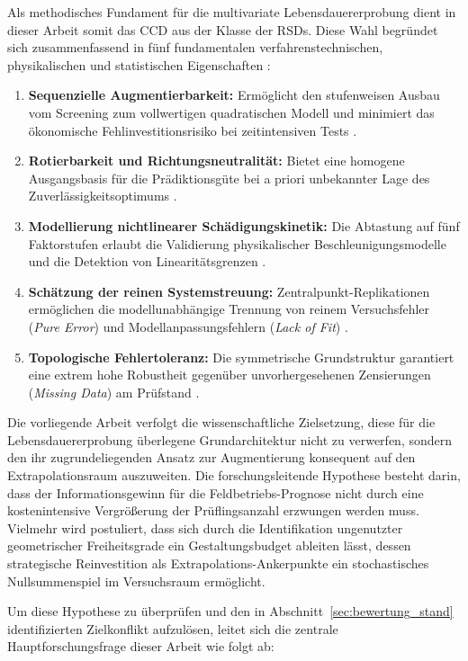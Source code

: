Als methodisches Fundament für die multivariate Lebensdauererprobung dient in dieser Arbeit somit das \ac{CCD} aus der Klasse der \acp{RSD}.
Diese Wahl begründet sich zusammenfassend in fünf fundamentalen verfahrenstechnischen, physikalischen und statistischen Eigenschaften \cite{Box.1957, Meeker.2022, Myers.2016}:
\begin{enumerate}
    \item \textbf{Sequenzielle Augmentierbarkeit:} Ermöglicht den stufenweisen Ausbau vom Screening zum vollwertigen quadratischen Modell und minimiert das ökonomische Fehlinvestitionsrisiko bei zeitintensiven Tests \cite{Bertsche.2022}.
    \item \textbf{Rotierbarkeit und Richtungsneutralität:} Bietet eine homogene Ausgangsbasis für die Prädiktionsgüte bei a priori unbekannter Lage des Zuverlässigkeitsoptimums \cite{Meeker.2022}.
    \item \textbf{Modellierung nichtlinearer Schädigungskinetik:} Die Abtastung auf fünf Faktorstufen erlaubt die Validierung physikalischer Beschleunigungsmodelle und die Detektion von Linearitätsgrenzen \cite{Yang.2007, Modarres.2017}.
    \item \textbf{Schätzung der reinen Systemstreuung:} Zentralpunkt-Replikationen ermöglichen die modellunabhängige Trennung von reinem Versuchsfehler (\textit{Pure Error}) und Modellanpassungsfehlern (\textit{Lack of Fit}) \cite{Meeker.2022}.
    \item \textbf{Topologische Fehlertoleranz:} Die symmetrische Grundstruktur garantiert eine extrem hohe Robustheit gegenüber unvorhergesehenen Zensierungen (\textit{Missing Data}) am Prüfstand \cite{Montgomery.2020}.
\end{enumerate}

Die vorliegende Arbeit verfolgt die wissenschaftliche Zielsetzung, diese für die Lebensdauererprobung überlegene Grundarchitektur nicht zu verwerfen, sondern den ihr zugrundeliegenden Ansatz zur Augmentierung konsequent auf den Extrapolationsraum auszuweiten.
Die forschungsleitende Hypothese besteht darin, dass der Informationsgewinn für die Feldbetriebs-Prognose nicht durch eine kostenintensive Vergrößerung der Prüflingsanzahl erzwungen werden muss.
Vielmehr wird postuliert, dass sich durch die Identifikation ungenutzter geometrischer Freiheitsgrade ein Gestaltungsbudget ableiten lässt, dessen strategische Reinvestition als Extrapolations-Ankerpunkte ein stochastisches Nullsummenspiel im Versuchsraum ermöglicht.

Um diese Hypothese zu überprüfen und den in Abschnitt~\ref{sec:bewertung_stand} identifizierten Zielkonflikt aufzulösen, leitet sich die zentrale Hauptforschungsfrage dieser Arbeit wie folgt ab:

